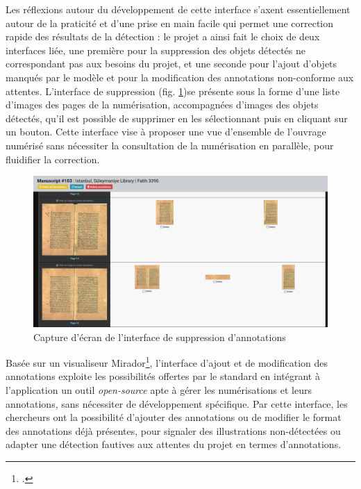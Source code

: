 	Les réflexions autour du développement de cette interface s'axent essentiellement autour de la praticité et d'une prise en main facile qui permet une correction rapide des résultats de la détection : le projet \eida a ainsi fait le choix de deux interfaces liée, une première pour la suppression des objets détectés ne correspondant pas aux besoins du projet, et une seconde pour l'ajout d'objets manqués par le modèle et pour la modification des annotations non-conforme aux attentes. L'interface de suppression (fig. \ref{fig:eida_delete_anno})se présente sous la forme d'une liste d'images des pages de la numérisation, accompagnées d'images des objets détectés, qu'il est possible de supprimer en les sélectionnant puis en cliquant sur un bouton. Cette interface vise à proposer une vue d'ensemble de l'ouvrage numérisé sans nécessiter la consultation de la numérisation en parallèle, pour fluidifier la correction.
  	
  	\begin{figure}[h]
		\centering
		\includegraphics[width=16cm]{images/eida_delete_anno.png}
		\caption{Capture d'écran de l'interface \eida de suppression d'annotations}
		\label{fig:eida_delete_anno}
	\end{figure}

	Basée sur un visualiseur Mirador\footcite{MiradorHome}, l'interface d'ajout et de modification des annotations exploite les possibilités offertes par le standard \iiif en intégrant à l'application \eida un outil \textit{open-source} apte à gérer les numérisations et leurs annotations, sans nécessiter de développement spécifique. Par cette interface, les chercheurs ont la possibilité d'ajouter des annotations ou de modifier le format des annotations déjà présentes, pour signaler des illustrations non-détectées ou adapter une détection fautives aux attentes du projet en termes d'annotations.
	
